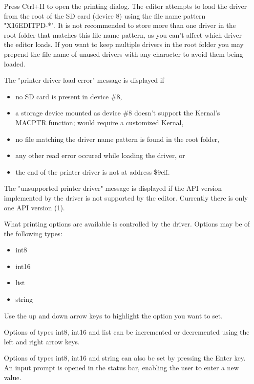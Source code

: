 \documentclass{article}
\begin{document}
        Press Ctrl+H to open the printing dialog. The editor attempts to load the driver from
        the root of the SD card (device 8) using the file name pattern "X16EDITPD-*". It is not
        recommended to store more than one driver in the root folder that matches this
        file name pattern, as you can't affect which driver the editor loads. If you
        want to keep multiple drivers in the root folder you may prepend
        the file name of unused drivers with any character to avoid them being loaded.

        The "printer driver load error" message is displayed if
        \begin{itemize}
            \item no SD card is present in device \#8,
            \item a storage device mounted as device \#8 doesn't support the Kernal's MACPTR function; would require a customized Kernal,
            \item no file matching the driver name pattern is found in the root folder,
            \item any other read error occured while loading the driver, or
            \item the end of the printer driver is not at address \$9eff.
        \end{itemize}

        The "unsupported printer driver" message is displayed if the API version implemented
        by the driver is not supported by the editor. Currently there is only one API version (1).

        What printing options are available is controlled by the driver. Options may be of the
        following types:
        \begin{itemize}
            \item int8
            \item int16
            \item list
            \item string
        \end{itemize}

        Use the up and down arrow keys to highlight the option you want to set. 
        
        Options of types int8, int16 and list can be incremented or decremented using the left 
        and right arrow keys.

        Options of types int8, int16 and string can also be set by pressing the Enter key.
        An input prompt is opened in the status bar, enabling the user to enter a
        new value.
\end{document}
